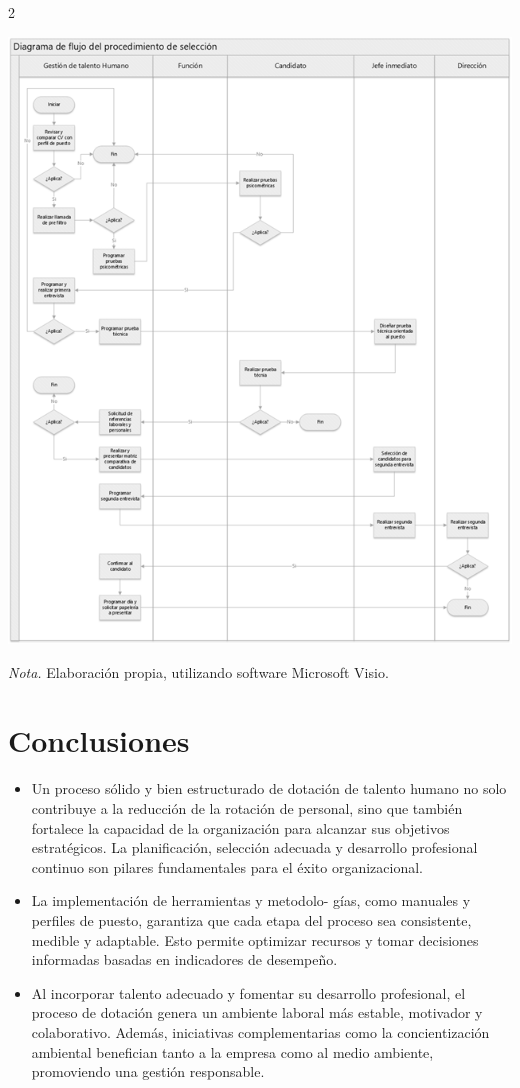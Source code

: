 \documentclass[12pt,spanish,Letterpaper,openany]{book}
\begin{document}
\begin {multicols}{2}
\begin {flushleft}
\begin{minipage}[c]{\columnwidth}
\begin{center}\includegraphics[width=0.8\linewidth]{imagenes_articulos/art05_03} \end{center}

\emph{Nota.} Elaboración propia, utilizando software Microsoft Visio.

\end{minipage}
\end {flushleft}

\hypertarget{conclusiones-4}{%
\section{Conclusiones}\label{conclusiones-4}}

\begin{itemize}
\item
  Un proceso sólido y bien estructurado de dotación de talento humano no solo contribuye a la reducción de la rotación de personal, sino que también fortalece la capacidad de la organización para alcanzar sus objetivos estratégicos. La planificación, selección adecuada y desarrollo profesional continuo son pilares fundamentales para el éxito organizacional.
\item
  La implementación de herramientas y metodolo-
  gías, como manuales y perfiles de puesto, garantiza que cada etapa del proceso sea consistente, medible y adaptable. Esto permite optimizar recursos y tomar decisiones informadas basadas en indicadores de desempeño.
\item
  Al incorporar talento adecuado y fomentar su desarrollo profesional, el proceso de dotación genera un ambiente laboral más estable, motivador y colaborativo. Además, iniciativas complementarias como la concientización ambiental benefician tanto a la empresa como al medio ambiente, promoviendo una gestión responsable.
\end{itemize}


\end{multicols}
\end{document}
